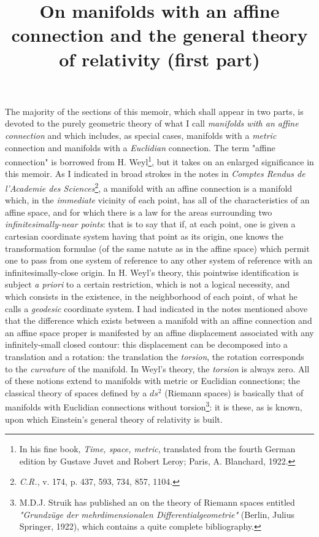 \documentclass{report}
\title{On manifolds with an affine connection and the general theory of relativity (first part)}
\begin{document}
The majority of the sections of this memoir, which shall appear in two parts, is devoted to the purely geometric theory of what I call \textit{manifolds with an affine connection} and which includes, as special cases, manifolds with a \textit{metric} connection and manifolds with a \textit{Euclidian} connection. The term "affine connection" is borrowed from H. Weyl\footnote{In his fine book, \textit{Time, space, metric}, translated from the fourth German edition by Gustave Juvet and Robert Leroy; Paris, A. Blanchard, 1922.}, but it takes on an enlarged significance in this memoir. As I indicated in broad strokes in the notes in \textit{Comptes Rendus de l'Academie des Sciences}\footnote{\textit{C.R.}, v. 174, p. 437, 593, 734, 857, 1104.}, a manifold with an affine connection is a manifold which, in the \textit{immediate} vicinity of each point, has all of the characteristics of an affine space, and for which there is a law for  the areas surrounding two \textit{infinitesimally-near points}: that is to say that if, at each point, one is given a cartesian coordinate system having that point as its origin, one knows the transformation formulae (of the same natute as in the affine space) which permit one to pass from one system of reference to any other system of reference with an infinitesimally-close origin. In H. Weyl's theory, this pointwise identification is subject \textit{a priori} to a certain restriction, which is not a logical necessity, and which consists in the existence, in the neighborhood of each point, of what he calls a \textit{geodesic} coordinate system. I had indicated in the notes mentioned above that the difference which exists between a manifold with an affine connection and an affine space proper is manifested by an affine displacement associated with any infinitely-small closed contour: this displacement can be decomposed into a translation and a rotation: the translation  the \textit{torsion}, the rotation corresponds to the \textit{curvature} of the manifold. In Weyl's theory, the \textit{torsion} is always zero. All of these notions extend to manifolds with metric or Euclidian connections; the classical theory of spaces defined by a $ds^2$ (Riemann spaces) is basically that of manifolds with Euclidian connections without torsion\footnote{M.D.J. Struik has published an  on the theory of Riemann spaces entitled \textit{"Grundz\"uge der mehrdimensionalen Differentialgeometrie"} (Berlin, Julius Springer, 1922), which contains a quite complete bibliography.}: it is these, as is known, upon which Einstein's general theory of relativity is built.
\end{document}
